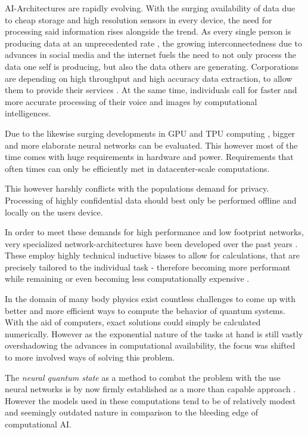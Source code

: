 AI-Architectures are rapidly evolving. With the surging availability of data due to cheap storage \cite*[]{costDataStorage} and high resolution sensors in every device, the need for processing said information rises alongside the trend.
As every single person is producing data at an unprecedented rate \cite*[]{dataCreatedRate}, the growing interconnectedness due to advances in social media and the internet fuels the need to not only process the data one self is producing, but also the data others are generating.
Corporations are depending on high throughput and high accuracy data extraction, to allow them to provide their services \cite*[]{marketsizeArtificialIntelligence}.
At the same time, individuals call for faster and more accurate processing of their voice and images by computational intelligences. 

Due to the likewise surging developments in GPU and TPU computing \cite*[]{gpuPerformanceOverTime}, bigger and more elaborate neural networks can be evaluated.
This however most of the time comes with huge requirements in hardware and power. 
Requirements that often times can only be efficiently met in datacenter-scale computations.

This however harshly conflicts with the populations demand for privacy. 
Processing of highly confidential data should best only be performed offline and locally on the users device.

In order to meet these demands for high performance and low footprint networks, very specialized network-architectures have been developed over the past years \cite[]{attentionIsAllYouNeed, metaformerPaper}. 
These employ highly technical inductive biases to allow for calculations, that are precisely tailored to the individual task - therefore becoming more performant while remaining or even becoming less computationally expensive \cite*[]{mobileNetPaper}.

In the domain of many body physics exist countless challenges to come up with better and more efficient ways to compute the behavior of quantum systems.
With the aid of computers, exact solutions could \glqq simply\grqq{} be calculated numerically.
However as the exponential nature of the tasks at hand is still vastly overshadowing the advances in computational availability, the focus was shifted to more involved ways of solving this problem.

The \emph{neural quantum state} as a method to combat the problem with the use neural networks is by now firmly established as a more than capable approach \cite*[]{quantumMBPwithneuralNetworks}. However the models used in these computations tend to be of relatively modest and seemingly \glqq outdated\grqq{} nature in comparison to the bleeding edge of computational AI.

